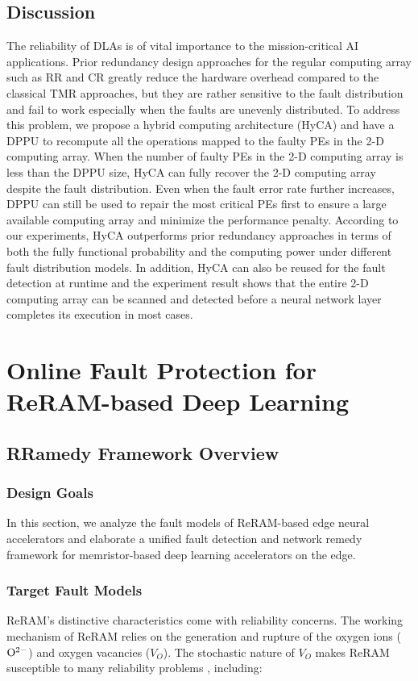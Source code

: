 \subsection{Discussion}
The reliability of DLAs is of vital importance to the mission-critical AI applications. Prior redundancy design approaches for the regular computing array such as RR and CR greatly reduce the hardware overhead compared to the classical TMR approaches, but they are rather sensitive to the fault distribution and fail to work especially when the faults are unevenly distributed. To address this problem, we propose a hybrid computing architecture (HyCA) and have a DPPU to recompute all the operations mapped to the faulty PEs in the 2-D computing array. When the number of faulty PEs in the 2-D computing array is less than the DPPU size, HyCA can fully recover the 2-D computing array despite the fault distribution. Even when the fault error rate further increases, DPPU can still be used to repair the most critical PEs first to ensure a large available computing array and minimize the performance penalty. According to our experiments, HyCA outperforms prior redundancy approaches in terms of both the fully functional probability and the computing power under different fault distribution models. In addition, HyCA can also be reused for the fault detection at runtime and the experiment result shows that the entire 2-D computing array can be scanned and detected before a neural network layer completes its execution in most cases.

\section{Online Fault Protection for ReRAM-based Deep Learning}
\subsection{RRamedy Framework Overview}
\subsubsection{Design Goals}
In this section, we analyze the fault models of ReRAM-based edge neural accelerators and elaborate a unified fault detection and network remedy framework for memristor-based deep learning accelerators on the edge. 
\subsubsection{Target Fault Models} 
ReRAM's distinctive characteristics come with reliability concerns. The working mechanism of ReRAM relies on the generation and rupture of the oxygen ions (${{\rm{O}}^{2 - }}$) and oxygen vacancies  (${V_O}$). The stochastic nature of ${V_O}$ makes ReRAM susceptible to many reliability problems \cite{7987496}, including:


